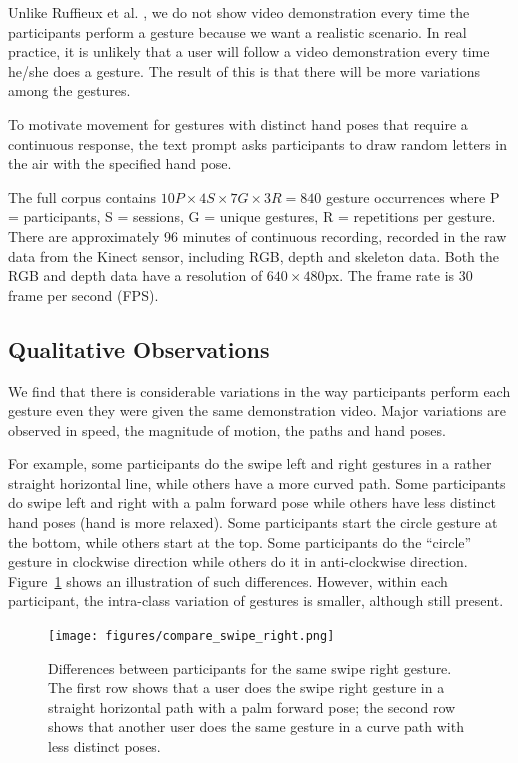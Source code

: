 Unlike Ruffieux et al. \cite{Ruffieux2013}, we do not show video demonstration
every time the participants perform a gesture because we want a
realistic scenario. In real practice, it is unlikely that a user will follow a
video demonstration every time he/she does a gesture. The result of this is that
there will be more variations among the gestures.

To motivate movement for gestures with distinct hand poses that
require a continuous response, the text prompt asks participants to draw
random letters in the air with the specified hand pose. 

The full corpus contains $
10P \times 4S \times 7G \times 3R = 840$ gesture occurrences
where P = participants, S = sessions, G = unique gestures, R = repetitions per
gesture. There are approximately 96 minutes of continuous recording,
recorded in the raw data from the Kinect sensor, including RGB, depth and
skeleton data. Both the RGB and depth data have a resolution of
$640\times480$px. The frame rate is 30 frame per second (FPS).

\subsection{Qualitative Observations}
We find that there is considerable variations in the way participants perform
each gesture even they were given the same demonstration video. Major variations
are observed in speed, the magnitude of motion, the paths and hand poses.

For example, some participants do the swipe left and right gestures in a rather
straight horizontal line, while others have a more curved path.  Some
participants do swipe left and right with a palm forward pose while others have
less distinct hand poses (hand is more relaxed). Some participants start
the circle gesture at the bottom, while others start at the top. Some
participants do the ``circle'' gesture in clockwise direction while others do it
in anti-clockwise direction. Figure~\ref{fig:compare-swipe-right} shows
an illustration of such differences. However, within each participant, the
intra-class variation of gestures is smaller, although still present.

\begin{figure}[tbh]
\centering
\texttt{[image: figures/compare\_swipe\_right.png]}
\caption{Differences between participants for the same swipe right gesture. 
The first row shows that a user does the swipe right gesture in a straight
horizontal path with a palm forward pose; the second row shows that another user
does the same gesture in a curve path with less distinct poses.}
\label{fig:compare-swipe-right}
\end{figure}

